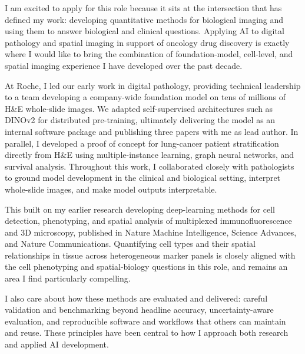 \documentclass[10pt, letter]{ag-cv} %
\begin{document}
\makecvheader %

\makelettertitlenorec %


\begin{cvletter}


\begin{flushleft}

I am excited to apply for this role because it sits  at the intersection that has defined my work: developing quantitative methods for biological imaging and using them to answer biological and clinical questions. Applying AI to digital pathology and spatial imaging in support of oncology drug discovery is exactly where I would like to bring the combination of foundation-model, cell-level, and spatial imaging experience I have developed over the past decade.

At Roche, I led our early work in digital pathology, providing technical leadership to a team developing a company-wide foundation model on tens of millions of H&E whole-slide images. We adapted self-supervised architectures such as DINOv2 for distributed pre-training, ultimately delivering the model as an internal software package and publishing three papers with me as lead author. In parallel, I developed a proof of concept for lung-cancer patient stratification directly from H&E using multiple-instance learning, graph neural networks, and survival analysis. Throughout this work, I collaborated closely with pathologists to ground model development in the clinical and biological setting, interpret whole-slide images, and make model outputs interpretable.

This built on my earlier research developing deep-learning methods for cell detection, phenotyping, and spatial analysis of multiplexed immunofluorescence and 3D microscopy, published in Nature Machine Intelligence, Science Advances, and Nature Communications. Quantifying cell types and their spatial relationships in tissue across heterogeneous marker panels is closely aligned with the cell phenotyping and spatial-biology questions in this role, and remains an area I find particularly compelling.

I also care about how these methods are evaluated and delivered: careful validation and benchmarking beyond headline accuracy, uncertainty-aware evaluation, and reproducible software and workflows that others can maintain and reuse. These principles have been central to how I approach both research and applied AI development.


\end{flushleft}
\end{cvletter}
\end{document}

